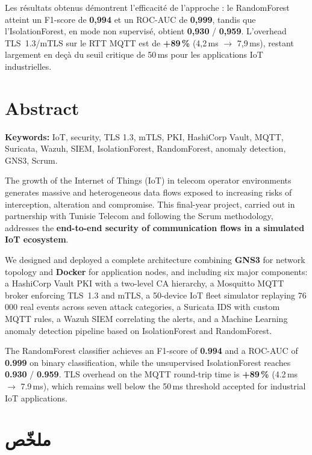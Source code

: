 \noindent Les résultats obtenus démontrent l'efficacité de l'approche : le RandomForest atteint un F1-score de \textbf{0,994} et un ROC-AUC de \textbf{0,999}, tandis que l'IsolationForest, en mode non supervisé, obtient \textbf{0,930} / \textbf{0,959}. L'overhead TLS~1.3/mTLS sur le RTT MQTT est de \textbf{+89\,\%} (4,2\,ms $\to$ 7,9\,ms), restant largement en deçà du seuil critique de 50\,ms pour les applications IoT industrielles.

\bigskip

\chapter*{Abstract}

\noindent\textbf{Keywords:} IoT, security, TLS 1.3, mTLS, PKI, HashiCorp Vault, MQTT, Suricata, Wazuh, SIEM, IsolationForest, RandomForest, anomaly detection, GNS3, Scrum.

\noindent The growth of the Internet of Things (IoT) in telecom operator environments generates massive and heterogeneous data flows exposed to increasing risks of interception, alteration and compromise. This final-year project, carried out in partnership with Tunisie Telecom and following the Scrum methodology, addresses the \textbf{end-to-end security of communication flows in a simulated IoT ecosystem}.

\noindent We designed and deployed a complete architecture combining \textbf{GNS3} for network topology and \textbf{Docker} for application nodes, and including six major components: a HashiCorp Vault PKI with a two-level CA hierarchy, a Mosquitto MQTT broker enforcing TLS~1.3 and mTLS, a 50-device IoT fleet simulator replaying 76\,000 real events across seven attack categories, a Suricata IDS with custom MQTT rules, a Wazuh SIEM correlating the alerts, and a Machine Learning anomaly detection pipeline based on IsolationForest and RandomForest.

\noindent The RandomForest classifier achieves an F1-score of \textbf{0.994} and a ROC-AUC of \textbf{0.999} on binary classification, while the unsupervised IsolationForest reaches \textbf{0.930} / \textbf{0.959}. TLS overhead on the MQTT round-trip time is \textbf{+89\,\%} (4.2\,ms $\to$ 7.9\,ms), which remains well below the 50\,ms threshold accepted for industrial IoT applications.

\bigskip

\chapter*{\textarabic{ملخّص}}

